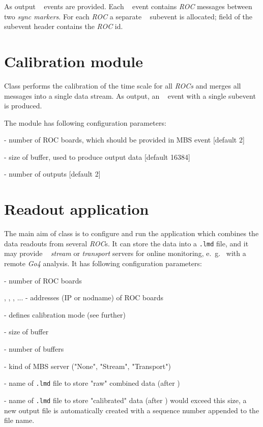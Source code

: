 As output \mbs~ events are provided. Each \mbs~ event contains {\em ROC} messages between two {\em sync markers}.
For each {\em ROC} a separate \mbs~ subevent is allocated; 
field  of the subevent header contains the {\em ROC} id.


\section{Calibration module}

Class  performs the calibration of the time scale for all
{\em ROCs} and merges all messages into a single data stream. 
As output, an \mbs~ event with a single
subevent is produced. 

The module has following configuration parameters:
\bbul
\item {}     - number of ROC boards, which should be provided in MBS event [default 2]  
\item {}  - size of buffer, used to produce output data [default 16384]
\item {}  - number of outputs [default 2]
\ebul
 

\section{Readout application}

The main aim of  class is to configure and run 
the application which combines the data readouts from several {\em ROC}s.
It can store the data into a {\tt \*.lmd} file, and it  
may provide  \mbs~ {\em stream} or {\em transport} servers 
for online monitoring, e.~g.~ with a remote {\em Go4} analysis.
It has following configuration parameters:

\bbul
\item {}   - number of ROC boards  
\item {}, , , ... - addresses (IP or nodname) of ROC boards
\item {}  - defines calibration mode (see further)
\item {} - size of buffer
\item {} - number of buffers
\item {} - kind of MBS server ("None", "Stream", "Transport")
\item {} - name of {\tt \*.lmd} file to store "raw" combined data (after
)
\item {} - name of {\tt \*.lmd} file to store "calibrated" data (after
)
would exceed this size, a new output file is automatically created with a sequence number appended to the file name.
\ebul

